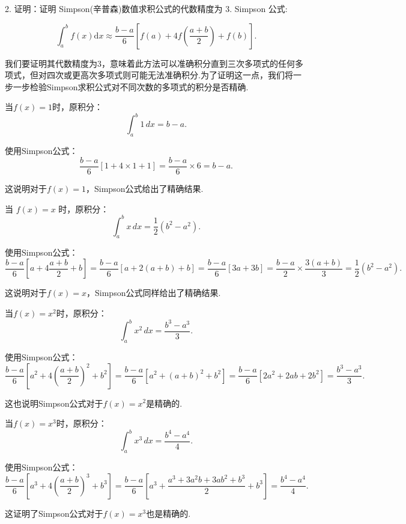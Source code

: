  \begin{tcolorbox}[enhanced,colback=10,colframe=9,breakable,coltitle=green!25!black,title=2024]

2. 证明：证明 Simpson(辛普森)数值求积公式的代数精度为 3.
\tcblower
Simpson 公式:

$${\int}_{a}^{b}f(x)\mathrm{d}x {\approx} \frac{b {-} a}{6}\left\lbrack f(a) + 4f\left( \frac{a + b}{2} \right) + f(b) \right\rbrack.$$


我们要证明其代数精度为3，意味着此方法可以准确积分直到三次多项式的任何多项式，但对四次或更高次多项式则可能无法准确积分.为了证明这一点，我们将一步一步检验Simpson求积公式对不同次数的多项式的积分是否精确.

  当$f(x) = 1$时，原积分：
$$\int_a^b 1 \, dx = b - a.$$

使用Simpson公式：
$$\frac{b-a}{6} \left[1 + 4 \times 1 + 1\right] = \frac{b-a}{6} \times 6 = b - a.$$

这说明对于$f(x) = 1$，Simpson公式给出了精确结果.

当 $f(x) = x$ 时，原积分：
$$\int_a^b x \, dx = \frac{1}{2}(b^2 - a^2).$$

使用Simpson公式：
$$\frac{b-a}{6} \left[a + 4\frac{a+b}{2} + b\right] = \frac{b-a}{6} \left[a + 2(a+b) + b\right] = \frac{b-a}{6} \left[3a + 3b\right] = \frac{b-a}{2} \times \frac{3(a+b)}{3} = \frac{1}{2}(b^2 - a^2).$$

这说明对于$f(x) = x$，Simpson公式同样给出了精确结果.

当$f(x) = x^2$时，原积分：
$$\int_a^b x^2 \, dx = \frac{b^3 - a^3}{3}.$$

使用Simpson公式：
$$\frac{b-a}{6} \left[a^2 + 4\left(\frac{a+b}{2}\right)^2 + b^2\right] = \frac{b-a}{6} \left[a^2 + (a+b)^2 + b^2\right] = \frac{b-a}{6} \left[2a^2 + 2ab + 2b^2\right] = \frac{b^3 - a^3}{3}.$$

这也说明Simpson公式对于$f(x) = x^2$是精确的.

当$f(x) = x^3$时，原积分：
$$\int_a^b x^3 \, dx = \frac{b^4 - a^4}{4}.$$

使用Simpson公式：
$$\frac{b-a}{6} \left[a^3 + 4\left(\frac{a+b}{2}\right)^3 + b^3\right] = \frac{b-a}{6} \left[a^3 + \frac{a^3 + 3a^2b + 3ab^2 + b^3}{2} + b^3\right] = \frac{b^4 - a^4}{4}.$$

这证明了Simpson公式对于$f(x) = x^3$也是精确的.


\end{tcolorbox}

